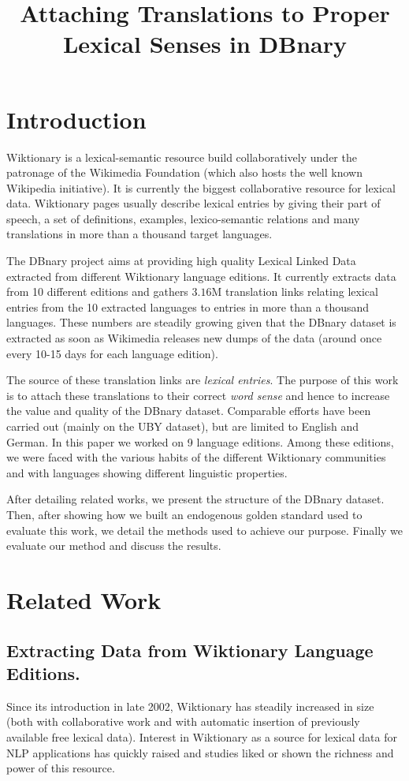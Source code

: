 \documentclass[10pt, a4paper]{article}
\title{Attaching Translations to Proper Lexical Senses in DBnary}
\begin{document}
\maketitleabstract

\section{Introduction}

 Wiktionary is a lexical-semantic resource build collaboratively under the patronage of the Wikimedia Foundation (which also hosts the well known Wikipedia initiative). It is currently the biggest collaborative resource for lexical data. Wiktionary pages usually describe lexical entries by giving their part of speech, a set of definitions, examples, lexico-semantic relations and many translations in more than a thousand target languages.

The DBnary project \cite{serasset:dbnary-swj} aims at providing high quality Lexical Linked Data extracted from different Wiktionary language editions. It currently extracts data from 10 different editions and gathers $3.16$M translation links relating lexical entries from the 10 extracted languages to entries in more than a thousand languages. These numbers are steadily growing given that the DBnary dataset is extracted as soon as Wikimedia releases new dumps of the data (around once every 10-15 days for each language edition).

The source of these translation links are \emph{lexical entries}. The purpose of this work is to attach these translations to their correct \emph{word sense} and hence to increase the value and quality of the DBnary dataset. Comparable efforts have been carried out (mainly on the UBY dataset), but are limited to English and German. In this paper we worked on 9 language editions. Among these editions, we were faced with the various habits of the different Wiktionary communities and with languages showing different linguistic properties. 

After detailing related works, we present the structure of the DBnary dataset. Then, after showing how we built an endogenous golden standard used to evaluate this work, we detail the methods used to achieve our purpose. Finally we evaluate our method and discuss the results.

\section{Related Work}

\subsection{Extracting Data from Wiktionary Language Editions.} Since its introduction in late 2002, Wiktionary has steadily increased in size (both with collaborative work and with automatic insertion of previously available free lexical data). Interest in Wiktionary as a source for lexical data for NLP applications has quickly raised and studies liked \cite{Zesch:AAAI2008} or \cite{navarro-EtAl:2009:PeoplesWeb} shown the richness and power of this resource. 
\end{document}
